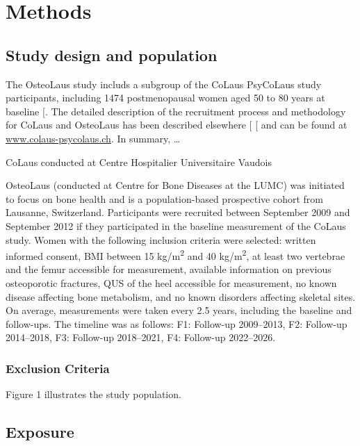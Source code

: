 \documentclass[
  11pt,
]{article}
\author{}
\date{}
\begin{document}
\section{Methods}\label{methods}

\subsection{Study design and
population}\label{study-design-and-population}

The OsteoLaus study includs a subgroup of the CoLaus \textbar{}
PsyCoLaus study participants, including 1474 postmenopausal women aged
50 to 80 years at baseline {[}\citeproc{ref-shevroja2019}{1}{]}. The
detailed description of the recruitment process and methodology for
CoLaus and OsteoLaus has been described elsewhere
{[}\citeproc{ref-firmann2008}{2}{]} {[}\citeproc{ref-shevroja2019}{1}{]}
and can be found at
\href{http://www.colaus-psycolaus.ch/}{www.colaus-psycolaus.ch}. In
summary, \ldots{}

CoLaus conducted at Centre Hospitalier Universitaire Vaudois

OsteoLaus (conducted at Centre for Bone Diseases at the LUMC) was
initiated to focus on bone health and is a population-based prospective
cohort from Lausanne, Switzerland. Participants were recruited between
September 2009 and September 2012 if they participated in the baseline
measurement of the CoLaus study. Women with the following inclusion
criteria were selected: written informed consent, BMI between 15
kg/m\textsuperscript{2} and 40 kg/m\textsuperscript{2}, at least two
vertebrae and the femur accessible for measurement, available
information on previous osteoporotic fractures, QUS of the heel
accessible for measurement, no known disease affecting bone metabolism,
and no known disorders affecting skeletal sites. On average,
measurements were taken every 2.5 years, including the baseline and
follow-ups. The timeline was as follows: F1: Follow-up 2009--2013, F2:
Follow-up 2014--2018, F3: Follow-up 2018--2021, F4: Follow-up
2022--2026.

\subsubsection{Exclusion Criteria}\label{exclusion-criteria}

Figure 1 illustrates the study population.

\subsection{Exposure}\label{exposure}
\end{document}

